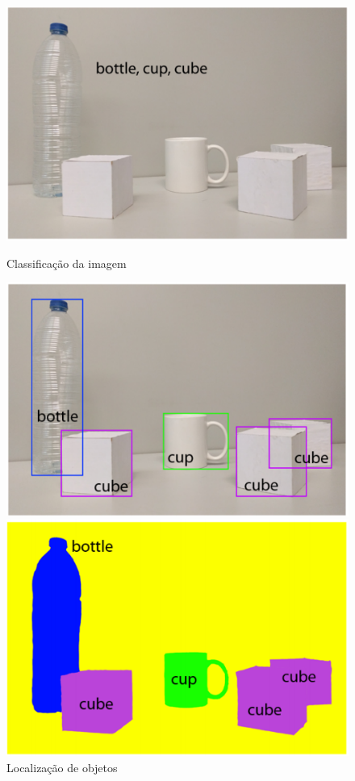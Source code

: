 \documentclass[12pt]{report}
\begin{document}
\begin{figure}
  \centering
  \begin{minipage}[b]{0.4\textwidth}
    \includegraphics[width=\textwidth]{images/seg1.png}
    \caption{Classificação da imagem}
    \label{fig:seg}
  \end{minipage}
  \hfill
  \begin{minipage}[b]{0.4\textwidth}
    \includegraphics[width=\textwidth]{images/seg2.png}
    \caption{Localização de objetos}
    \label{fig:seg2}
  \end{minipage}
    \hfill
  \begin{minipage}[b]{0.4\textwidth}
    \includegraphics[width=\textwidth]{images/seg3.png}

\end{minipage}
\end{figure}
\end{document}
